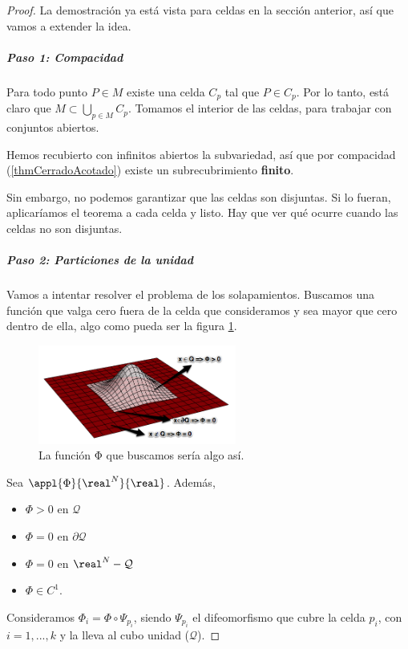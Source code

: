\begin{proof} La demostración ya está vista para celdas en la sección anterior, así que vamos a extender la idea.



\subparagraph{Paso 1: Compacidad}
Para todo punto $P\in M$ existe una celda $C_p$ tal que $P \in C_p$. Por lo tanto, está claro que $M\subset \bigcup_{p\in M} C_p$. Tomamos el interior de las celdas, para trabajar con conjuntos abiertos.

Hemos recubierto con infinitos abiertos la subvariedad, así que por compacidad (\ref{thmCerradoAcotado}) existe un subrecubrimiento \textbf{finito}.

Sin embargo, no podemos garantizar que las celdas son disjuntas. Si lo fueran, aplicaríamos el teorema a cada celda y listo. Hay que ver qué ocurre cuando las celdas no son disjuntas.

\subparagraph{Paso 2: Particiones de la unidad}

Vamos a intentar resolver el problema de los solapamientos. Buscamos una función que valga cero fuera de la celda que consideramos y sea mayor que cero dentro de ella, algo como pueda ser la figura \ref{imgStokesPhi}.

\begin{figure}
  \begin{center}
    \includegraphics[width=0.58\textwidth]{imgs/TeoremaStokes-PartUnidad.png}
  \end{center}
  \caption{La función Φ que buscamos sería algo así.}
  \label{imgStokesPhi}
\end{figure}
Sea $\appl{\Phi}{\real^N}{\real}$. Además,
\begin{itemize}
\item $\Phi>0$ en $\mathcal{Q}$
\item $\Phi = 0$ en $\partial  \mathcal{Q}$
\item $\Phi = 0$ en $\real^N-\mathcal{Q}$
\item $\Phi\in C^1$.
\end{itemize}
Consideramos $\Phi_i = \Phi\circ\Psi_{p_i}$, siendo $\Psi_{p_i}$ el difeomorfismo que cubre la celda $p_i$, con $i=1,...,k$ y la lleva al cubo unidad ($\mathcal{Q}$).


\end{proof}
